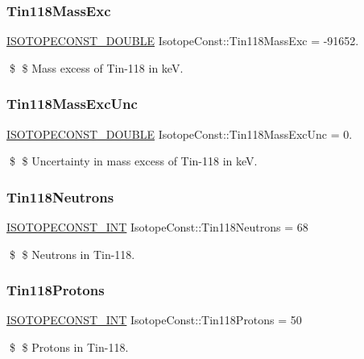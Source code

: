 \subsubsection{\texorpdfstring{Tin118\+Mass\+Exc}{Tin118MassExc}}
{\footnotesize\ttfamily \mbox{\hyperlink{group___isotope_const-_macros_ga8f45a7272ce02c0b4c65c44636ed719a}{I\+S\+O\+T\+O\+P\+E\+C\+O\+N\+S\+T\+\_\+\+D\+O\+U\+B\+LE}} Isotope\+Const\+::\+Tin118\+Mass\+Exc = -\/91652.}

\$ \$ Mass excess of Tin-\/118 in keV. \mbox{\label{group___isotope_const-_tin-_sn118_gafb019ce880941f02b44726bfffab0b5c}} 
\subsubsection{\texorpdfstring{Tin118\+Mass\+Exc\+Unc}{Tin118MassExcUnc}}
{\footnotesize\ttfamily \mbox{\hyperlink{group___isotope_const-_macros_ga8f45a7272ce02c0b4c65c44636ed719a}{I\+S\+O\+T\+O\+P\+E\+C\+O\+N\+S\+T\+\_\+\+D\+O\+U\+B\+LE}} Isotope\+Const\+::\+Tin118\+Mass\+Exc\+Unc = 0.}

\$ \$ Uncertainty in mass excess of Tin-\/118 in keV. \mbox{\label{group___isotope_const-_tin-_sn118_gab13d5b943667c1723cd6b4d62650ce39}} 
\subsubsection{\texorpdfstring{Tin118\+Neutrons}{Tin118Neutrons}}
{\footnotesize\ttfamily \mbox{\hyperlink{group___isotope_const-_macros_ga5f18360b3e99483a35c32d789e62621c}{I\+S\+O\+T\+O\+P\+E\+C\+O\+N\+S\+T\+\_\+\+I\+NT}} Isotope\+Const\+::\+Tin118\+Neutrons = 68}

\$ \$ Neutrons in Tin-\/118. \mbox{\label{group___isotope_const-_tin-_sn118_ga3d961ce70e6a5cf219ef6a06017464f3}} 
\subsubsection{\texorpdfstring{Tin118\+Protons}{Tin118Protons}}
{\footnotesize\ttfamily \mbox{\hyperlink{group___isotope_const-_macros_ga5f18360b3e99483a35c32d789e62621c}{I\+S\+O\+T\+O\+P\+E\+C\+O\+N\+S\+T\+\_\+\+I\+NT}} Isotope\+Const\+::\+Tin118\+Protons = 50}

\$ \$ Protons in Tin-\/118. 